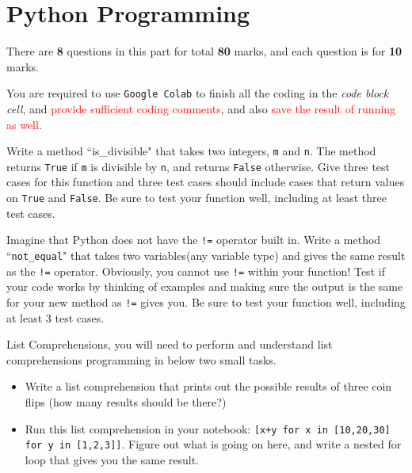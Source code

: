 \documentclass[a4paper]{article}
\begin{document}
    \part{Python Programming}\label{sec:part1}

    There are \textbf{8} questions in this part for total \textbf{80} marks, and each question is for \textbf{10} marks. 
    
    You are required to use \texttt{Google Colab} to 
    finish all the coding in the \textit{code block cell},
    and \textcolor{red}{provide sufficient coding comments},
    and also \textcolor{red}{save the result of running as well}. 
    
    \begin{answer}[Question 1.1] 
        Write a method ``is_divisible" that takes two integers, \texttt{m} and \texttt{n}. The method returns \texttt{True} if \texttt{m} is divisible by \texttt{n}, and returns \texttt{False} otherwise. Give three test cases for this function and three test cases should include cases that return values on \texttt{True} and \texttt{False}.
        Be sure to test your function well, including at least three test cases.
    
    \end{answer}
    
    \begin{answer}[Question 1.2]
    Imagine that Python does not have the \texttt{!=} operator built in. Write a method ``\texttt{not_equal}" that takes two variables(any variable type) and gives the same result as the \texttt{!=} operator. Obviously, you cannot use \texttt{!=} within your function! Test if your code works by thinking of examples and making sure the output is the same for your new method as \texttt{!=} gives you.
    Be sure to test your function well, including at least 3 test cases.
    \end{answer}
    
    \begin{answer}[Question 1.3]
    List Comprehensions, you will need to perform and understand list comprehensions programming in below two small tasks. 
    \begin{itemize}
        \item Write a list comprehension that prints out the possible results of three coin flips (how many results should be there?)
        \item Run this list comprehension in your notebook: \texttt{[x+y for x in [10,20,30] for y in [1,2,3]]}. 
        Figure out what is going on here, and write a nested for loop that gives you the same result.
    \end{itemize}
    
    \end{answer}
    
\end{document}
